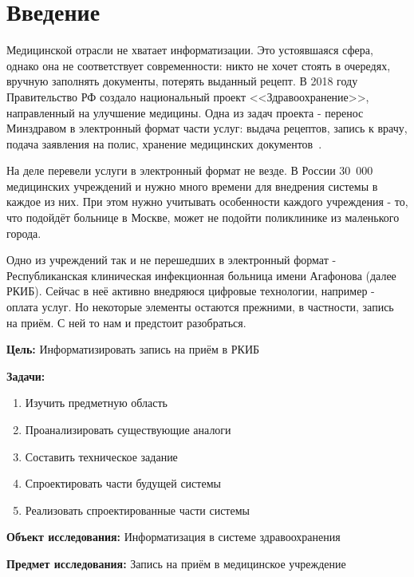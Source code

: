 \documentclass[a4paper,article]{article}
\begin{document}
    \section*{Введение}

        Медицинской отрасли не хватает информатизации. Это устоявшаяся сфера, однако она не соответствует современности: никто не хочет стоять в очередях, вручную заполнять документы, потерять выданный рецепт. В 2018 году Правительство РФ создало национальный проект <<Здравоохранение>>, направленный на улучшение медицины. Одна из задач проекта - перенос Минздравом в электронный формат части услуг: выдача рецептов, запись к врачу, подача заявления на полис, хранение медицинских документов~\cite{natsproektzdravoohranenie}.

        На деле перевели услуги в электронный формат не везде. В России 30~000 медицинских учреждений и нужно много времени для внедрения системы в каждое из них. При этом нужно учитывать особенности каждого учреждения - то, что подойдёт больнице в Москве, может не подойти поликлинике из маленького города.

        Одно из учреждений так и не перешедших в электронный формат - Республиканская клиническая инфекционная больница имени Агафонова (далее РКИБ). Сейчас в неё активно внедряюся цифровые технологии, например - оплата услуг. Но некоторые элементы остаются прежними, в частности, запись на приём. С ней то нам и предстоит разобраться.

        \textbf{Цель:} Информатизировать запись на приём в РКИБ

        \textbf{Задачи:}

        \begin{enumerate}[nolistsep]
            \item Изучить предметную область
            \item Проанализировать существующие аналоги
            \item Составить техническое задание
            \item Спроектировать части будущей системы
            \item Реализовать спроектированные части системы
        \end{enumerate}

        \textbf{Объект исследования:} Информатизация в системе здравоохранения

        \textbf{Предмет исследования:} Запись на приём в медицинское учреждение
\end{document}
